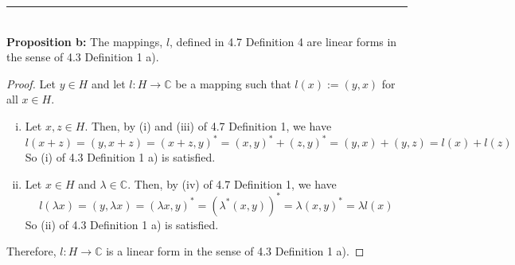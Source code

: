 \documentclass[]{book}
\begin{document}
\noindent\rule{15cm}{0.4pt} \\

{\bf Proposition b:} The mappings, $l$, defined in 4.7 Definition 4 are linear forms in the sense of 4.3 Definition 1 a).
\begin{proof}
Let $y\in H$ and let $l:H\to \mathbb{C}$ be a mapping such that $l(x):=(y,x)$ for all $x\in H$. 
\begin{enumerate}[(i)]
\item Let $x,z\in H$. Then, by (i) and (iii) of 4.7 Definition 1, we have
$$l(x+z)=(y,x+z)=(x+z,y)^*=(x,y)^*+(z,y)^*=(y,x)+(y,z)=l(x)+l(z)$$
So (i) of 4.3 Definition 1 a) is satisfied.
\item Let $x\in H$ and $\lambda\in\mathbb{C}$. Then, by (iv) of 4.7 Definition 1, we have
$$l(\lambda x)=(y,\lambda x) = (\lambda x,y)^*=(\lambda^*(x,y))^*=\lambda(x,y)^*=\lambda l(x)$$
So (ii) of 4.3 Definition 1 a) is satisfied.
\end{enumerate}
Therefore, $l:H\to\mathbb{C}$ is a linear form in the sense of 4.3 Definition 1 a).
\end{proof}
\end{document}

